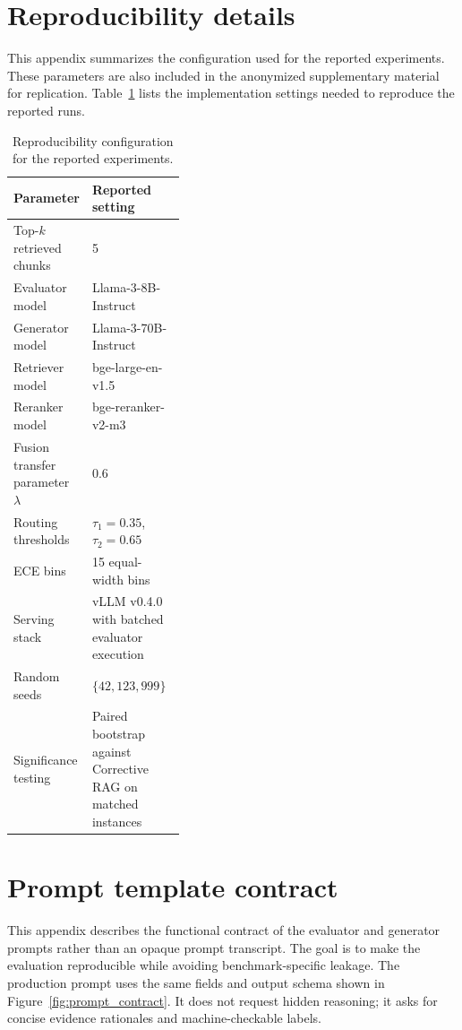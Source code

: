 \documentclass[preprint,12pt,authoryear,nopreprintline]{elsarticle}
\begin{document}
\appendix

\section{Reproducibility details}
\label{app:repro}

This appendix summarizes the configuration used for the reported experiments. These parameters are also included in the anonymized supplementary material for replication. Table~\ref{tab:repro} lists the implementation settings needed to reproduce the reported runs.

\begin{table}[H]
\centering
\caption{Reproducibility configuration for the reported experiments.}
\label{tab:repro}
\small
\begin{tabularx}{\linewidth}{>{\raggedright\arraybackslash}p{0.38\linewidth}X}
\toprule
Parameter & Reported setting \\
\midrule
Top-$k$ retrieved chunks & 5 \\
Evaluator model & Llama-3-8B-Instruct \\
Generator model & Llama-3-70B-Instruct \\
Retriever model & bge-large-en-v1.5 \\
Reranker model & bge-reranker-v2-m3 \\
Fusion transfer parameter $\lambda$ & 0.6 \\
Routing thresholds & $\tau_1=0.35$, $\tau_2=0.65$ \\
ECE bins & 15 equal-width bins \\
Serving stack & vLLM v0.4.0 with batched evaluator execution \\
Random seeds & $\{42,123,999\}$ \\
Significance testing & Paired bootstrap against Corrective RAG on matched instances \\
\bottomrule
\end{tabularx}
\end{table}

\section{Prompt template contract}
\label{app:prompts}

This appendix describes the functional contract of the evaluator and generator prompts rather than an opaque prompt transcript. The goal is to make the evaluation reproducible while avoiding benchmark-specific leakage. The production prompt uses the same fields and output schema shown in Figure~\ref{fig:prompt_contract}. It does not request hidden reasoning; it asks for concise evidence rationales and machine-checkable labels.
\end{document}
